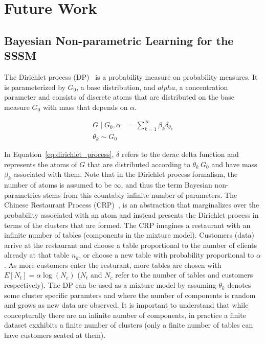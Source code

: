 \section{Future Work}
\subsection{Bayesian Non-parametric Learning for the SSSM}\label{sec:non-parameteric}
The Dirichlet process (DP)~\cite{ferguson1973bayesian} is a probability measure on probability measures. It is parameterized by $G_0$, a base distribution, and $alpha$, a concentration parameter and consists of discrete atoms that are distributed on the base measure $G_0$ with mass that depends on $\alpha$.

\begin{equation}\label{eq:dirichlet_process}
  \begin{split}
    G \mid G_0, \alpha &= \sum\limits_{k=1}^{\infty} \beta_k \delta_{\theta_k} \\
    \theta_k \sim G_0
  \end{split}
\end{equation}

In Equation~\ref{eq:dirichlet_process}, $\delta$ refers to the derac delta function and represents the atoms of $G$ that are distributed according to $\theta_k ~ G_0$ and have mass $\beta_k$ associated with them. Note that in the Dirichlet process formalism, the number of atoms is assumed to be $\infty$, and thus the term Bayesian non-parametrics stems from this countably infinite number of parameters. The Chinese Restaurant Process (CRP)~\citep{neal2000markov, gershman2012tutorial}, is an abstraction that marginalizes over the probability associated with an atom and instead presents the Dirichlet process in terms of the clusters that are formed. The CRP imagines a restaurant with an infinite number of tables (components in the mixture model). Customers (data) arrive at the restaurant and choose a table proportional to the number of clients already at that table $n_k$, or choose a new table with probability proportional to $\alpha$. As more customers enter the resturant, more tables are chosen with $E[N_t] = \alpha \log(N_c)$ ($N_t$ and $N_c$ refer to the number of tables and customers respectively). The DP can be used as a mixture model by assuming $\theta_k$ denotes some cluster specific paramters and where the number of components is random and grows as new data are observed. It is important to understand that while concepturally there are an infinite number of components, in practice a finite dataset exxhibits a finite number of clusters (only a finite number of tables can have customers seated at them).

